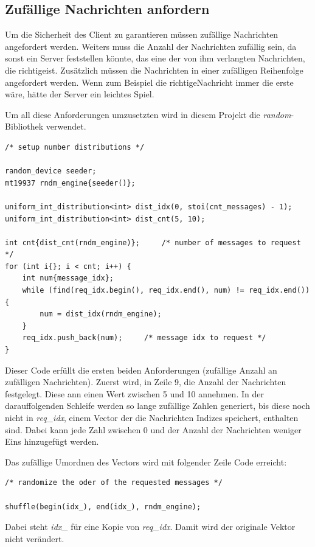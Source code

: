 \documentclass[]{article}
\begin{document}
\subsection{Zufällige Nachrichten anfordern}
Um die Sicherheit des Client zu garantieren müssen zufällige Nachrichten angefordert werden. Weiters muss die Anzahl der Nachrichten zufällig sein, da sonst ein Server feststellen könnte, das eine der von ihm verlangten Nachrichten, die \glqq richtige\grqq ist. Zusätzlich müssen die Nachrichten in einer zufälligen Reihenfolge angefordert werden. Wenn zum Beispiel die \glqq richtige\grqq Nachricht immer die erste wäre, hätte der Server ein leichtes Spiel.

Um all diese Anforderungen umzusetzten wird in diesem Projekt die \textit{random}-Bibliothek verwendet.

\begin{lstlisting}
/* setup number distributions */

random_device seeder;
mt19937 rndm_engine{seeder()};

uniform_int_distribution<int> dist_idx(0, stoi(cnt_messages) - 1);
uniform_int_distribution<int> dist_cnt(5, 10);

int cnt{dist_cnt(rndm_engine)};     /* number of messages to request */
for (int i{}; i < cnt; i++) {
	int num{message_idx};
	while (find(req_idx.begin(), req_idx.end(), num) != req_idx.end()) {
		num = dist_idx(rndm_engine);
	}
	req_idx.push_back(num);     /* message idx to request */
}
\end{lstlisting}

Dieser Code erfüllt die ersten beiden Anforderungen (zufällige Anzahl an zufälligen Nachrichten). Zuerst wird, in Zeile 9, die Anzahl der Nachrichten festgelegt. Diese ann einen Wert zwischen 5 und 10 annehmen. In der darauffolgenden Schleife werden so lange zufällige Zahlen generiert, bis diese noch nicht in \textit{req\_idx}, einem Vector der die Nachrichten Indizes speichert, enthalten sind. Dabei kann jede Zahl zwischen 0 und der Anzahl der Nachrichten weniger Eins hinzugefügt werden.

Das zufällige Umordnen des Vectors wird mit folgender Zeile Code erreicht:

\begin{lstlisting}
/* randomize the oder of the requested messages */

shuffle(begin(idx_), end(idx_), rndm_engine);
\end{lstlisting}

Dabei steht \textit{idx\_} für eine Kopie von \textit{req\_idx}. Damit wird der originale Vektor nicht verändert.
\end{document}
